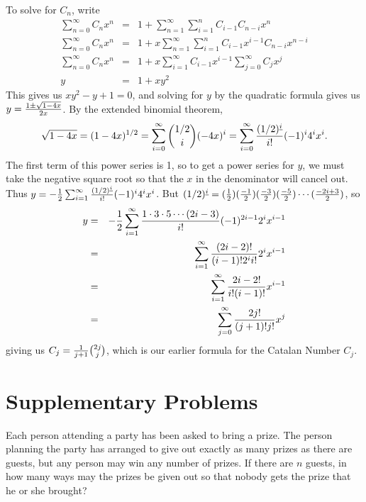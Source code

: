 {To solve for $C_n$, write
\begin{eqnarray*}
\sum_{n=0}^\infty C_nx^n &=&1+\sum_{n=1}^\infty\sum_{i=1}^nC_{i-1}C_{n-i}x^n\\
\sum_{n=0}^\infty C_nx^n
&=&1+x\sum_{n=1}^\infty\sum_{i=1}^nC_{i-1}x^{i-1}C_{n-i}x^{n-i}\\
\sum_{n=0}^\infty C_nx^n
&=&1+x\sum_{i=1}^\infty C_{i-1}x^{i-1}\sum_{j=0}^\infty C_{j}x^{j}\\
y&=&1 + xy^2
\end{eqnarray*}
This gives us $xy^2-y+1=0$, and solving for $y$ by the quadratic formula gives us
$y={1\pm \sqrt{1-4x}\over 2x}$.  By the extended binomial theorem,
$$\sqrt{1-4x}=(1-4x)^{1/2} = \sum_{i=0}^\infty {1/2\choose i}(-4x)^i=
\sum_{i=0}^\infty {(1/2)^{\underline{i}}\over i!}(-1)^i4^ix^i.$$
The first term of this power series is 1, so to get a power series for $y$, we must
take the negative square root so that the $x$ in the denominator will cancel
out.  Thus $y=-{1\over2}\sum_{i=1}^\infty {(1/2)^{\underline{i}}\over
i!}(-1)^i4^ix^i$. But
$(1/2)^{\underline{i}}=({1\over2})({-1\over2})({-3\over2})({-5\over2})\cdots
({-2i+3\over 2})$, so 
\begin{eqnarray*}y&=&-{1\over2}\sum_{i=1}^\infty{1\cdot3\cdot5\cdots(2i-3)\over
i!}(-1)^{2i-1}2^ix^{i-1}\\
&=& \sum_{i=1}^\infty {(2i-2)!\over
(i-1)!2^{i}i!}2^ix^{i-1}\\&=& \sum_{i=1}^\infty{2i-2!\over i!(i-1)!}x^{i-1}\\
&=&\sum_{j=0}^\infty{2j!\over (j+1)!j!}x^j
\end{eqnarray*}
giving us $C_j={1\over j+1}{2j\choose j}$, which is our earlier formula for the
Catalan Number $C_j$.}


\ep

\section{Supplementary Problems}
\bp
\item Each person attending a party has been asked to bring a prize.  The
person planning the party has arranged to give out exactly as many prizes
as there are guests, but any person may win any number of prizes.  If
there are $n$ guests, in how many ways may the prizes be given out so
that nobody gets the prize that he or she brought?
 
